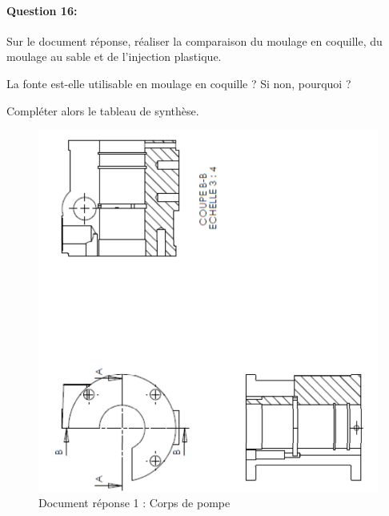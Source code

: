 \paragraph{Question 16:} Sur le document réponse, réaliser la comparaison du moulage en coquille, du moulage au sable et de l'injection plastique.

La fonte est-elle utilisable en moulage en coquille ? Si non, pourquoi ?

Compléter alors le tableau de synthèse.

\newpage

\begin{figure}[!h]
 \includegraphics[width=0.9\linewidth]{img/dessin1.png}
 \caption{Document réponse 1 : Corps de pompe}
\end{figure}

\newpage

